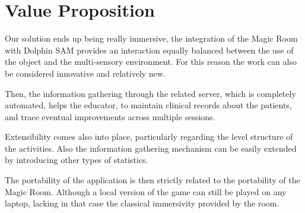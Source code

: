 \chapter{Value Proposition}

Our solution ends up being really immersive, the integration of the Magic Room with Dolphin SAM provides an interaction equally balanced between the use of the object and the multi-sensory environment. 
For this reason the work can also be considered innovative and relatively new. 

Then, the information gathering through the related server, which is completely automated, helps the educator, to maintain clinical records about the patients, and trace eventual improvements across multiple sessions.

Extensibility comes also into place, particularly regarding the level structure of the activities. Also the information gathering mechanism can be easily extended by introducing other types of statistics. 

The portability of the application is then strictly related to the portability of the Magic Room. Although a local version of the game can still be played on any laptop, lacking in that case the classical immersivity provided by the room.